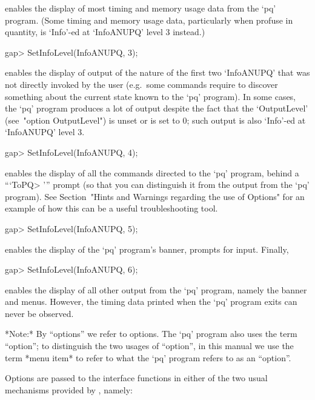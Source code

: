 enables the display of most timing and memory usage data  from  the  `pq'
program. (Some timing and memory usage data, particularly when profuse in
quantity, is `Info'-ed at `InfoANUPQ' level 3 instead.)

\beginexample
gap> SetInfoLevel(InfoANUPQ, 3);
\endexample

enables the display of output of the nature of the first two  `InfoANUPQ'
that was not directly invoked by the  user  (e.g.~some  commands  require
{\GAP} to discover something about the current state known  to  the  `pq'
program). In some cases, the  `pq'  program  produces  a  lot  of  output
despite the fact that the  `OutputLevel'  (see~"option  OutputLevel")  is
unset or is set to 0; such output is also `Info'-ed at `InfoANUPQ'
level 3.

\beginexample
gap> SetInfoLevel(InfoANUPQ, 4);
\endexample

enables the display of all the commands  directed  to  the  `pq'  program,
behind a ```ToPQ> ''' prompt (so that you can  distinguish  it  from  the
output from the `pq' program). See Section~"Hints and Warnings  regarding
the use of  Options"  for  an  example  of  how  this  can  be  a  useful
troubleshooting tool.

\beginexample
gap> SetInfoLevel(InfoANUPQ, 5);
\endexample

enables the display of the  `pq'  program's  banner,  prompts  for  input.
Finally,

\beginexample
gap> SetInfoLevel(InfoANUPQ, 6);
\endexample

enables the display of all other output from the `pq' program, namely  the
banner and menus. However, the timing data printed when the  `pq'  program
exits can never be observed.


*Note:*
By ``options'' we refer to {\GAP} options. The `pq' program also uses  the
term ``option''; to distinguish the two usages  of  ``option'',  in  this
manual we use the term *menu item* to  refer  to  what  the  `pq'  program
refers to as an ``option''.

Options are passed to the {\ANUPQ} interface functions in either  of  the
two usual mechanisms provided by {\GAP}, namely:

\beginlist%

